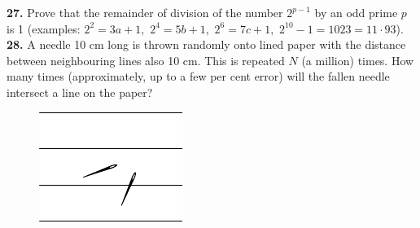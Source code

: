 \documentclass[12pt]{article}  %
\begin{document}
\newpage
\noindent
{\bf 27.} Prove that the remainder of division of the number $2^{p-1}$ by an odd prime $p$ is 1
(examples: $2^2 = 3a +1,$ $2^4 = 5b+1,$ $2^6 = 7c+1,$ 
$2^{10} - 1 = 1023 = 11\cdot 93$).  
\newline\newline\quad
{\bf 28.} A needle 10 cm long is thrown randomly onto lined paper with the distance between neighbouring
lines also 10 cm. This is repeated
$N$ (a million) times. 
How many times (approximately, up to a few per
cent error) will the fallen needle intersect a line on the paper?
\begin{figure}[h]
\centering
\footnotesize
\includegraphics[scale=1]{taskbook-12}
\end{figure}
\end{document}
